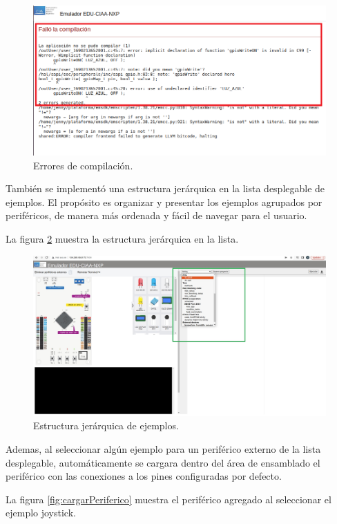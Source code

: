 \begin{figure}[ht]
	\centering
	\includegraphics[scale=.46]{./Figures/PlataformaErrores2.png}
	\caption{Errores de compilación.}
	\label{fig:PlataformaErrores1}
\end{figure}

También se implementó una estructura jerárquica en la lista desplegable de ejemplos. El propósito es organizar y presentar los ejemplos agrupados por periféricos, de manera más ordenada y fácil de navegar para el usuario.

La figura \ref{fig:listExamples} muestra la estructura jerárquica en la lista.

\begin{figure}[ht]
	\centering
	\includegraphics[scale=.25]{./Figures/listExamples.jpg}
	\caption{Estructura jerárquica de ejemplos. }
	\label{fig:listExamples}
\end{figure}

Ademas, al seleccionar algún ejemplo para un periférico externo de la lista desplegable, automáticamente se cargara dentro del área de ensamblado el periférico con las conexiones a los pines configuradas por defecto.

La figura \ref{fig:cargarPeriferico} muestra el periférico agregado al seleccionar el ejemplo \textquotedbl joystick\textquotedbl.

